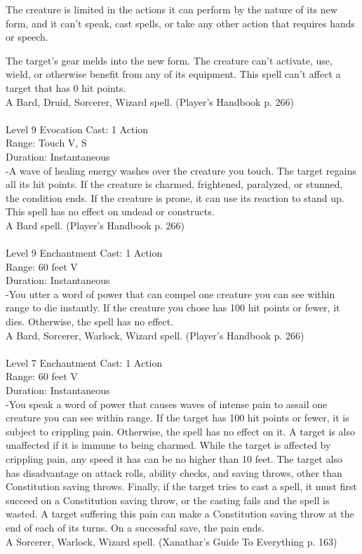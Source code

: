 \documentclass[10pt,twocolumn]{report}
\begin{document}
The creature is limited in the actions it can perform by the nature of its new form, and it can’t speak, cast spells, or take any other action that requires hands or speech.

The target’s gear melds into the new form. The creature can’t activate, use, wield, or otherwise benefit from any of its equipment. This spell can’t affect a target that has 0 hit points.\\
A Bard, Druid, Sorcerer, Wizard spell. (Player's Handbook p. 266) \\


 \\
Level 9 \quad Evocation \quad Cast: 1 Action\\
Range: Touch \quad V, S\\
Duration: Instantaneous \quad \\
-A wave of healing energy washes over the creature you touch. The target regains all its hit points. If the creature is charmed, frightened, paralyzed, or stunned, the condition ends. If the creature is prone, it can use its reaction to stand up. This spell has no effect on undead or constructs.\\
A Bard spell. (Player's Handbook p. 266) \\


 \\
Level 9 \quad Enchantment \quad Cast: 1 Action\\
Range: 60 feet \quad V\\
Duration: Instantaneous \quad \\
-You utter a word of power that can compel one creature you can see within range to die instantly. If the creature you chose has 100 hit points or fewer, it dies. Otherwise, the spell has no effect.\\
A Bard, Sorcerer, Warlock, Wizard spell. (Player's Handbook p. 266) \\


 \\
Level 7 \quad Enchantment \quad Cast: 1 Action\\
Range: 60 feet \quad V\\
Duration: Instantaneous \quad \\
-You speak a word of power that causes waves of intense pain to assail one creature you can see within range. If the target has 100 hit points or fewer, it is subject to crippling pain. Otherwise, the spell has no effect on it. A target is also unaffected if it is immune to being charmed.
While the target is affected by crippling pain, any speed it has can be no higher than 10 feet. The target also has disadvantage on attack rolls, ability checks, and saving throws, other than Constitution saving throws. Finally, if the target tries to cast a spell, it must first succeed on a Constitution saving throw, or the casting fails and the spell is wasted.
A target suffering this pain can make a Constitution saving throw at the end of each of its turns. On a successful save, the pain ends.\\
A Sorcerer, Warlock, Wizard spell. (Xanathar's Guide To Everything p. 163) \\
\end{document}
